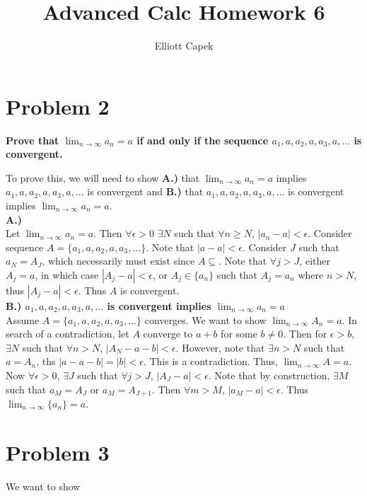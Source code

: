 \documentclass[10pt]{article} %
\title{Advanced Calc Homework 6}
\author{Elliott Capek}
\begin{document}
\maketitle{}

\section{Problem 2}
\textbf{Prove that $\lim_{n\rightarrow\infty}a_n = a$ if and only if the sequence $a_1, a, a_2, a, a_3, a,...$ is convergent.}

To prove this, we will need to show \textbf{A.)} that $\lim_{n\rightarrow\infty}a_n = a$ implies $a_1, a, a_2, a, a_3, a,...$ is convergent and \textbf{B.)} that $a_1, a, a_2, a, a_3, a,...$ is convergent implies $\lim_{n\rightarrow\infty}a_n = a$.\\

\textbf{A.)}\\
Let $\lim_{n\rightarrow\infty}a_n = a$. Then $\forall \epsilon>0$ $\exists N$ such that $\forall n \geq N$, $|a_n-a|<\epsilon$. Consider sequence $A = \{a_1, a, a_2, a, a_3, ...\}$. Note that $|a-a|<\epsilon$. Consider $J$ such that $a_N = A_J$, which necessarily must exist since $A \subseteq$. Note that $\forall j>J$, either $A_j = a$, in which case $|A_j-a|<\epsilon$, or $A_j \in \{a_n\}$ such that $A_j = a_n$ where $n > N$, thus $|A_j-a|<\epsilon$. Thus $A$ is convergent.\\

\textbf{B.) $a_1, a, a_2, a, a_3, a,...$ is convergent implies $\lim_{n\rightarrow\infty}a_n = a$}\\
Assume $A = \{a_1, a, a_2, a, a_3, ...\}$ converges. We want to show $\lim_{n\rightarrow\infty}A_n = a$. In search of a contradiction, let $A$ converge to $a + b$ for some $b \neq 0$. Then for $\epsilon > b$, $\exists N$ such that $\forall n > N$, $|A_N-a-b|<\epsilon$. However, note that $\exists n > N$ such that $a = A_n$, ths $|a - a - b| = |b| < \epsilon$. This is a contradiction. Thus, $\lim_{n\rightarrow\infty} A = a$.\\

Now $\forall \epsilon>0$, $\exists J$ such that $\forall j > J$, $|A_J - a|<\epsilon$. Note that by construction, $\exists M$ such that $a_M = A_J$ or $a_M = A_{J+1}$. Then $\forall m > M$, $|a_M - a|<\epsilon$. Thus $\lim_{n\rightarrow\infty}\{a_n\} = a$.\\

\section{Problem 3}
We want to show
\end{document}
